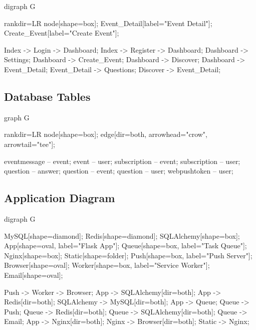 \documentclass[a4paper,oneside,12pt,draft]{report}
\begin{document}
	\begin{center}
		\begin{dot2tex}
			digraph G {
			rankdir=LR
			node[shape=box];
			Event_Detail[label="Event Detail"];
			Create_Event[label="Create Event"];


			Index -> Login -> Dashboard;
			Index -> Register -> Dashboard;
			Dashboard -> Settings;
			Dashboard -> Create_Event;
			Dashboard -> Discover;
			Dashboard -> Event_Detail;
			Event_Detail -> Questions;
			Discover -> Event_Detail;
			}
		\end{dot2tex}
	\end{center}

	\subsection{Database Tables}
	\begin{center}
		\begin{dot2tex}[neato]
			graph G {
			rankdir=LR
			node[shape=box];
			edge[dir=both, arrowhead="crow", arrowtail="tee"];

			eventmessage -- event;
			event -- user;
			subscription -- event;
			subscription -- user;
			question -- answer;
			question -- event;
			question -- user;
			webpushtoken -- user;
			}
		\end{dot2tex}
	\end{center}

	\subsection{Application Diagram}
	\begin{center}
		\begin{dot2tex}
			digraph G {
			MySQL[shape=diamond];
			Redis[shape=diamond];
			SQLAlchemy[shape=box];
			App[shape=oval, label="Flask App"];
			Queue[shape=box, label="Task Queue"];
			Nginx[shape=box];
			Static[shape=folder];
			Push[shape=box, label="Push Server"];
			Browser[shape=oval];
			Worker[shape=box, label="Service Worker"];
			Email[shape=oval];

			Push -> Worker -> Browser;
			App -> SQLAlchemy[dir=both];
			App -> Redis[dir=both];
			SQLAlchemy -> MySQL[dir=both];
			App -> Queue;
			Queue -> Push;
			Queue -> Redis[dir=both];
			Queue -> SQLAlchemy[dir=both];
			Queue -> Email;
			App -> Nginx[dir=both];
			Nginx -> Browser[dir=both];
			Static -> Nginx;

			}
		\end{dot2tex}
	\end{center}
\end{document}
